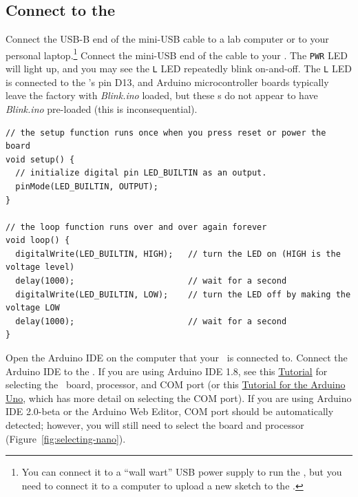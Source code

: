 \subsection{Connect to the \nano}

Connect the USB-B end of the mini-USB cable to a lab computer or to your
personal laptop.\footnote{You can connect it to a ``wall wart'' USB power
supply to run the \nano, but you need to connect it to a computer to upload a
new sketch to the \nano.} Connect the mini-USB end of the cable to your \nano.
The \texttt{PWR} LED will light up, and you may see the \texttt{L} LED
repeatedly blink on-and-off. The \texttt{L} LED is connected to the \nano's pin
D13, and Arduino microcontroller boards typically leave the factory with
\textit{Blink.ino} loaded, but these \nano{}s do not appear to have
\textit{Blink.ino} pre-loaded (this is inconsequential).

\begin{lstlisting}[basicstyle=\ttfamily\footnotesize]
// the setup function runs once when you press reset or power the board
void setup() {
  // initialize digital pin LED_BUILTIN as an output.
  pinMode(LED_BUILTIN, OUTPUT);
}

// the loop function runs over and over again forever
void loop() {
  digitalWrite(LED_BUILTIN, HIGH);   // turn the LED on (HIGH is the voltage level)
  delay(1000);                       // wait for a second
  digitalWrite(LED_BUILTIN, LOW);    // turn the LED off by making the voltage LOW
  delay(1000);                       // wait for a second
}
\end{lstlisting}

Open the Arduino IDE on the computer that your \nano\ is connected to. Connect
the Arduino IDE to the \nano. If you are using Arduino IDE 1.8, see this
\href{https://www.arduino.cc/en/Guide/ArduinoNano#select-your-board-type-and-port}{Tutorial}
for selecting the \nano\ board, processor, and COM port (or this
\href{https://www.arduino.cc/en/Guide/ArduinoUno#select-your-board-type-and-port}{Tutorial
for the Arduino Uno}, which has more detail on selecting the COM port). If you
are using Arduino IDE 2.0-beta or the Arduino Web Editor, COM port should be
automatically detected; however, you will still need to select the board and
processor (Figure~\ref{fig:selecting-nano}).


